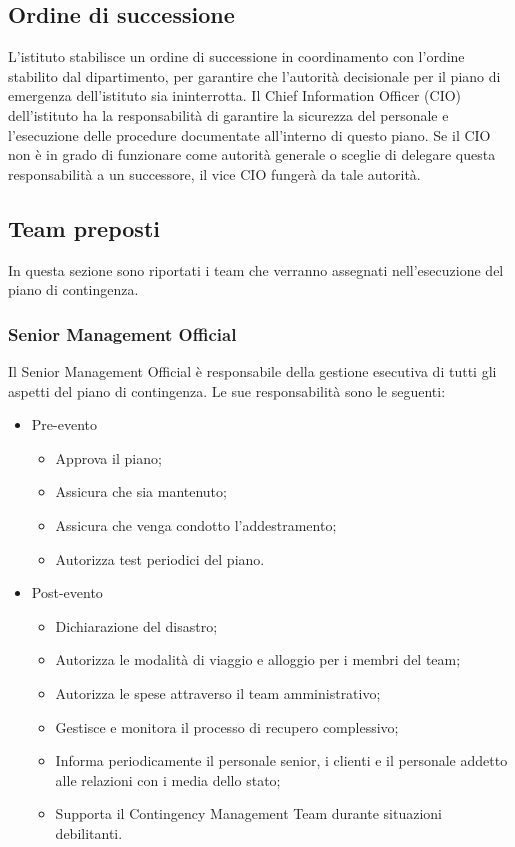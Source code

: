 \documentclass[12pt, a4paper, titlepage]{report}
\begin{document}
	\subsection{Ordine di successione}
	
	L'istituto stabilisce un ordine di successione in coordinamento con l'ordine stabilito dal dipartimento, per garantire che l'autorità decisionale per il piano di emergenza dell'istituto sia ininterrotta. Il Chief Information Officer (CIO) dell'istituto ha la responsabilità di garantire la sicurezza del personale e l'esecuzione delle procedure documentate all'interno di questo piano. Se il CIO non è in grado di funzionare come autorità generale o sceglie di delegare questa responsabilità a un successore, il vice CIO fungerà da tale autorità.
	
		\subsection{Team preposti}			
		
		In questa sezione sono riportati i team che verranno assegnati nell'esecuzione del piano di contingenza.
		
			\subsubsection{Senior Management Official}
			Il Senior Management Official è responsabile della gestione esecutiva di tutti gli aspetti del piano di contingenza. Le sue responsabilità sono le seguenti:
			\begin{itemize}
				\item Pre-evento
					\begin{itemize}
						\item Approva il piano;
						\item Assicura che sia mantenuto;
						\item Assicura che venga condotto l'addestramento;
						\item Autorizza test periodici del piano.
					\end{itemize}
				\item Post-evento
					\begin{itemize}
						\item Dichiarazione del disastro;
						\item Autorizza le modalità di viaggio e alloggio per i membri del team;
						\item Autorizza le spese attraverso il team amministrativo;
						\item Gestisce e monitora il processo di recupero complessivo;
						\item Informa periodicamente il personale senior, i clienti e il personale addetto alle relazioni con i media dello stato;
						\item Supporta il Contingency Management Team durante situazioni debilitanti.
					\end{itemize}
			\end{itemize}
			
\end{document}

